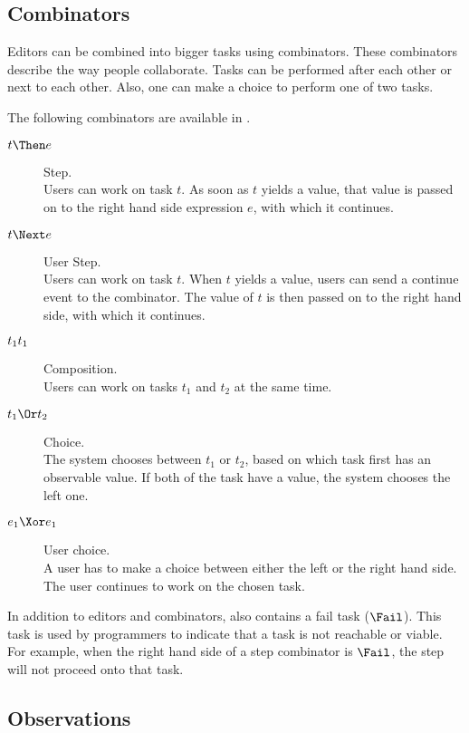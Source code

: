 \subsection{Combinators}

Editors can be combined into bigger tasks using combinators.
These combinators describe the way people collaborate.
Tasks can be performed after each other or next to each other.
Also, one can make a choice to perform one of two tasks.

The following combinators are available in \TOPHAT.
\begin{description}
  \item[$t \Then e$] Step.\\
    Users can work on task $t$.
    As soon as $t$ yields a value, that value is passed on to the right hand side expression $e$, with which it continues.
  \item[$t \Next e$] User Step.\\
    Users can work on task $t$.
    When $t$ yields a value, users can send a continue event to the combinator.
    The value of $t$ is then passed on to the right hand side, with which it continues.
  \item[$t_1 \relax t_1$] Composition.\\
    Users can work on tasks $t_1$ and $t_2$ at the same time.
  \item[$t_1 \Or t_2$] Choice.\\
    The system chooses between $t_1$ or $t_2$,
    based on which task first has an observable value.
    If both of the task have a value, the system chooses the left one.
  \item[$e_1 \Xor e_1$] User choice.\\
    A user has to make a choice between either the left or the right hand side.
    The user continues to work on the chosen task.
\end{description}

In addition to editors and combinators, \TOPHAT also contains a fail task ($\Fail$).
This task is used by programmers to indicate that a task is not reachable or viable.
For example, when the right hand side of a step combinator is $\Fail$, the step will not proceed onto that task.



\subsection{Observations}

